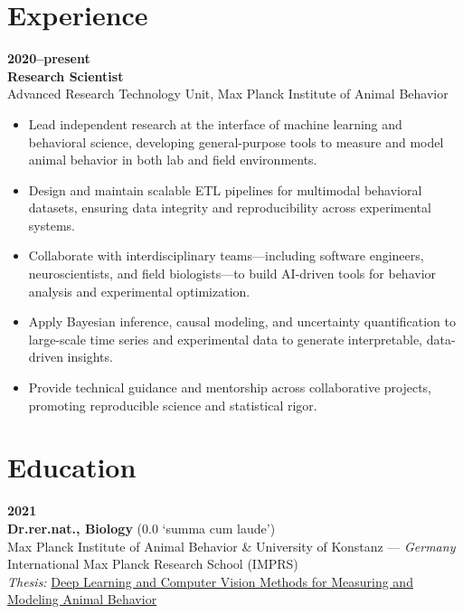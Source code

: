 \documentclass[10pt,letterpaper]{article}
\begin{document}
\vspace{-8pt}  %

\section*{Experience}
\textbf{2020--present}\\
\textbf{Research Scientist}\\
Advanced Research Technology Unit, Max Planck Institute of Animal Behavior
\begin{itemize}
	\item Lead independent research at the interface of machine learning and behavioral science, developing general-purpose tools to measure and model animal behavior in both lab and field environments.
	\item Design and maintain scalable ETL pipelines for multimodal behavioral datasets, ensuring data integrity and reproducibility across experimental systems.
	\item Collaborate with interdisciplinary teams—including software engineers, neuroscientists, and field biologists—to build AI-driven tools for behavior analysis and experimental optimization.
	\item Apply Bayesian inference, causal modeling, and uncertainty quantification to large-scale time series and experimental data to generate interpretable, data-driven insights.
	\item Provide technical guidance and mentorship across collaborative projects, promoting reproducible science and statistical rigor.
\end{itemize}

\vspace{-10pt}  %
\enlargethispage{1.5cm}  %

\section*{Education}

\textbf{2021} \\
\textbf{Dr.rer.nat., Biology} (0.0 ‘summa cum laude’) \\
Max Planck Institute of Animal Behavior \& University of Konstanz — \textit{Germany} \\
International Max Planck Research School (IMPRS) \\
\textit{Thesis:} \href{http://nbn-resolving.de/urn:nbn:de:bsz:352-2-dgcbudqch6ix8}{Deep Learning and Computer Vision Methods for Measuring and Modeling Animal Behavior} \\
\end{document}
